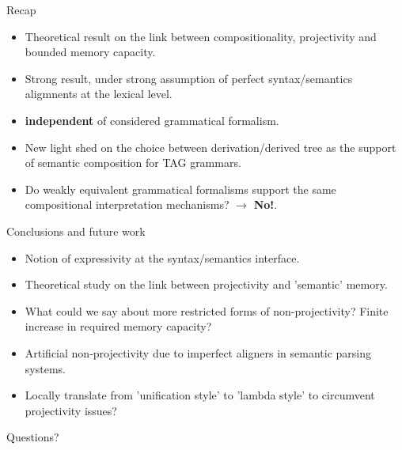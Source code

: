 \documentclass{beamer}
\newcommand{\hidden}[1]{}
\begin{document}
\hidden{
  \begin{frame}{Formalisation}
\end{frame}
}

\begin{frame}{Recap}
  \begin{itemize}
  \item Theoretical result on the link between compositionality,  projectivity and bounded memory capacity.
  \item Strong result, under strong assumption of perfect syntax/semantics aligmnents at the lexical level.
  \item \textbf{independent} of considered grammatical formalism.
  \item New light shed on the choice between derivation/derived tree as the support of semantic composition for TAG grammars.
  \item Do weakly equivalent grammatical formalisms support the same compositional interpretation mechanisms? $\rightarrow$ \textbf{No!}.
  \end{itemize}
\end{frame}

\begin{frame}{Conclusions and future work}
  \begin{itemize}
  \item Notion of expressivity at the syntax/semantics interface.
  \item Theoretical study on the link between projectivity and 'semantic' memory.
  \item What could we say about more restricted forms of non-projectivity? Finite increase in required memory capacity?
  \item Artificial non-projectivity due to imperfect aligners in semantic parsing systems.
  \item Locally translate from 'unification style' to 'lambda style' to circumvent projectivity issues?
  \end{itemize}
\end{frame}


\begin{frame}{}
  \begin{center}
    \huge Questions?
  \end{center}
\end{frame}
\end{document}
